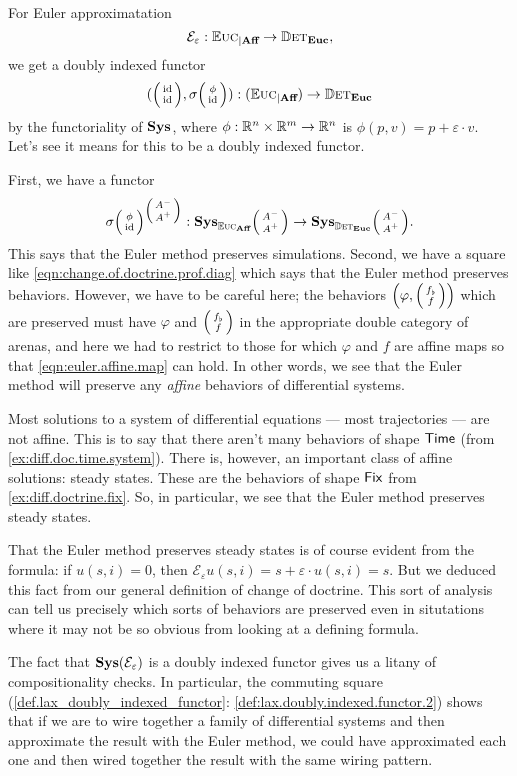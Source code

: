 \documentclass[DynamicalBook]{subfiles}
\begin{document}
\begin{example}
For Euler approximatation 
  \[
\mathcal{E}_{\varepsilon} : \mathbb{E}\textsc{uc}_{|\textbf{Aff}} \to \mathbb{D}\textsc{et}_{\textbf{Euc}},
  \]
  we get a doubly indexed functor
  $$(\littlelens{\id}{\id}, \sigma\littlelens{\phi}{\id}) : \Sys(\eucdiff_{|\textbf{Aff}}) \to \determ_{\Cat{Euc}}$$
  by the functoriality of $\textbf{Sys}$, where $\phi : \mathbb{R}^n \times \mathbb{R}^m \to
  \mathbb{R}^n$ is $\phi(p, v) = p + \varepsilon \cdot v$. Let's see it means for this
  to be a doubly indexed functor.

  First, we have a functor
  \[
    \sigma\littlelens{\phi}{\id}^{\littlelens{A^-}{A^+}} :
    \Cat{Sys}_{\eucdiff_{\textbf{Aff}}}\littlelens{A^-}{A^+} \to \Cat{Sys}_{\determ_{\Cat{Euc}}}\littlelens{A^-}{A^+}.
  \]
  This says that the Euler method preserves simulations. Second, we have a
  square like \cref{eqn:change.of.doctrine.prof.diag} which says that the Euler
  method preserves behaviors. However, we have to be careful here; the behaviors
  $\left( \varphi, \lens{f_{\flat}}{f} \right)$ which are preserved must have
$\varphi$ and $\lens{f_{\flat}}{f}$ in the appropriate double category of arenas, and here
  we had to restrict to those for which $\varphi$ and $f$ are affine maps so
  that \cref{eqn:euler.affine.map} can hold. In other words, we see that the
  Euler method will preserve any \emph{affine} behaviors of differential systems.

  Most solutions to a system of differential equations --- most trajectories ---
  are not affine. This is to say that
  there aren't many behaviors of shape $\mathsf{Time}$ (from
  \cref{ex:diff.doc.time.system}). There is, however, an important class of
  affine solutions: steady states. These are the behaviors of shape $\mathsf{Fix}$
  from \cref{ex:diff.doctrine.fix}. So, in particular, we see that the Euler
  method preserves steady states.

  That the Euler method preserves steady states is of course evident from the
  formula: if $u(s, i) = 0$, then $\mathcal{E}_{\varepsilon}u(s, i) = s +
  \varepsilon \cdot u(s, i) = s$. But we deduced this fact from our general
  definition of change of doctrine. This sort of analysis can tell us precisely
  which sorts of behaviors are preserved even in situtations where it may not be
  so obvious from looking at a defining formula.

  The fact that $\textbf{Sys}(\mathcal{E}_{\varepsilon})$ is a doubly indexed
  functor gives us a litany of compositionality checks. In particular, the
  commuting square (\cref{def.lax_doubly_indexed_functor}:
  \cref{def:lax.doubly.indexed.functor.2}) shows
  that if we are to wire together a family of differential systems and then
  approximate the result with the Euler method, we could have approximated each
  one and then wired together the result with the same wiring pattern.


  
\end{example}
\end{document}
